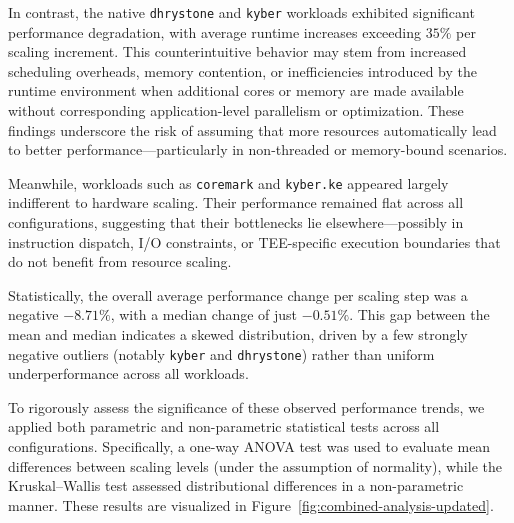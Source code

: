 In contrast, the native \texttt{dhrystone} and \texttt{kyber} workloads exhibited significant performance degradation, with average runtime increases exceeding $35\%$ per scaling increment. This counterintuitive behavior may stem from increased scheduling overheads, memory contention, or inefficiencies introduced by the runtime environment when additional cores or memory are made available without corresponding application-level parallelism or optimization. These findings underscore the risk of assuming that more resources automatically lead to better performance—particularly in non-threaded or memory-bound scenarios.

Meanwhile, workloads such as \texttt{coremark} and \texttt{kyber.ke} appeared largely indifferent to hardware scaling. Their performance remained flat across all configurations, suggesting that their bottlenecks lie elsewhere—possibly in instruction dispatch, I/O constraints, or TEE-specific execution boundaries that do not benefit from resource scaling.

Statistically, the overall average performance change per scaling step was a negative $-8.71\%$, with a median change of just $-0.51\%$. This gap between the mean and median indicates a skewed distribution, driven by a few strongly negative outliers (notably \texttt{kyber} and \texttt{dhrystone}) rather than uniform underperformance across all workloads.

To rigorously assess the significance of these observed performance trends, we applied both parametric and non-parametric statistical tests across all configurations. Specifically, a one-way ANOVA test was used to evaluate mean differences between scaling levels (under the assumption of normality), while the Kruskal–Wallis test assessed distributional differences in a non-parametric manner. These results are visualized in Figure~\ref{fig:combined-analysis-updated}.


